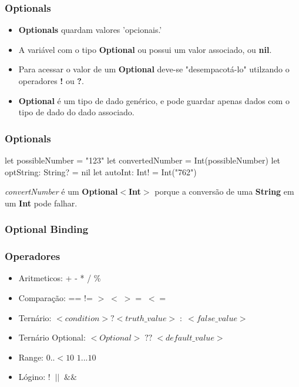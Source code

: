 \begin{frame}[fragile]
    \frametitle{Optionals}
    \begin{itemize}
        \item \textbf{Optionals} quardam valores 'opcionais.'
        \item A variável com o tipo \textbf{Optional} ou possui um valor
        associado, ou \textbf{nil}.
        \item Para acessar o valor de um \textbf{Optional} deve-se
        "desempacotá-lo" utilzando o operadores \textbf{!} ou \textbf{?}.
        \item \textbf{Optional} é um tipo de dado genérico, e pode guardar
        apenas dados com o tipo de dado do dado associado.
    \end{itemize}
\end{frame}

\begin{frame}[fragile]
    \frametitle{Optionals}

    \begin{swift}
        let possibleNumber = "123"
        let convertedNumber = Int(possibleNumber)
        let optString: String? = nil
        let autoInt: Int! = Int("762")
    \end{swift}
    \vspace{1cm}
    \textit{convertNumber} é um \textbf{Optional$<$Int$>$} porque a conversão
    de uma \textbf{String} em um \textbf{Int} pode falhar.
\end{frame}

\begin{frame}[fragile]
    \frametitle{Optional Binding}

\end{frame}

\begin{frame}[fragile]
    \frametitle{Operadores}

    \begin{itemize}
        \item Aritmeticos: + - * / \%
        \item Comparação: == != $> \; < \; >= \; <=$
        \item Ternário: $< condition > ? <truth\_value>\;:\;<false\_value> $
        \item Ternário Optional: $<Optional>\;??\;<default\_value> $
        \item Range: $0..{<}10$ $1...10$
        \item Lógino: $!\;\;||\;\;\&\&$
    \end{itemize}
\end{frame}


